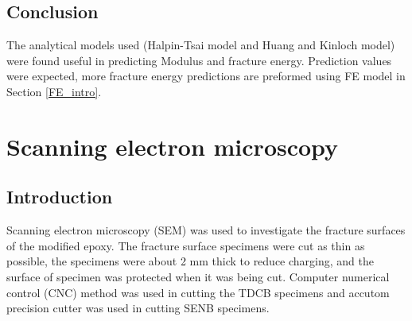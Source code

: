 \documentclass[numbers=noendperiod,chapterprefix=on]{icldt} %
\begin{document}
\section{Conclusion}
The analytical models used (Halpin-Tsai model and Huang and Kinloch model) were found useful in predicting Modulus and fracture energy. Prediction values were expected, more fracture energy predictions are preformed using FE model in Section \ref{FE_intro}.

\chapter{Scanning electron microscopy} \label{SEM}
\section{Introduction}

Scanning electron microscopy (SEM) was used to investigate the fracture surfaces of the modified epoxy. 
The fracture surface specimens were cut as thin as possible, the specimens were about 2 mm thick to reduce charging, and the surface of specimen was protected when it was being cut. Computer numerical control (CNC) method was used in cutting the TDCB specimens and accutom precision cutter was used in cutting SENB specimens. 
\end{document}
